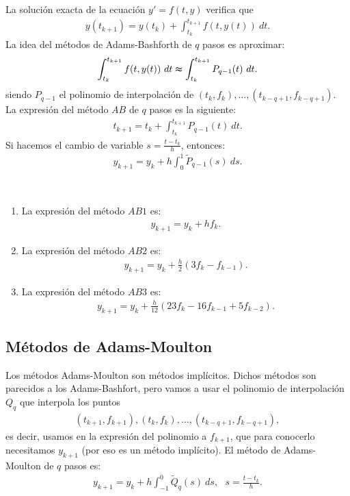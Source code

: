 \noindent La solución exacta de la ecuación $y' = f(t,y)$ verifica que 
\begin{align*}
    y(t_{k+1}) = y(t_k) + \int_{t_k}^{t_{k+1}} f(t,y(t)) \ dt.
\end{align*}
La idea del métodos de Adams-Bashforth de $q$ pasos es aproximar:
\begin{align*}
    \int_{t_k}^{t_{k+1}} f(t,y(t)) \ dt \thickapprox \int_{t_k}^{t_{k+1}} P_{q-1}(t) \ dt.
\end{align*}
siendo $P_{q-1}$ el polinomio de interpolación de $(t_k,f_k),\ldots,(t_{k-q+1},f_{k-q+1})$.
\\
\newline
La expresión del método $AB$ de $q$ pasos es la siguiente:
\begin{align*}
    t_{k+1} = t_k + \int_{t_k}^{t_{k+1}} P_{q-1}(t) \ dt.
\end{align*}
Si hacemos el cambio de variable $s = \frac{t - t_k}{h}$, entonces:
\begin{align*}
\boxed{
    y_{k+1} = y_k + h \int_{0}^{1} \widetilde{P}_{q-1}(s) \ ds.
}
\end{align*}

\begin{ejemplo} \
\begin{enumerate} 
    \item La expresión del método $AB1$ es:
    \begin{align*}
        y_{k+1} = y_k + hf_k.
    \end{align*}
    \item La expresión del método $AB2$ es:
    \begin{align*}
        y_{k+1} = y_k + \frac{h}{2}(3f_k - f_{k-1}).
    \end{align*}
    \item La expresión del método $AB3$ es:
    \begin{align*}
        y_{k+1} = y_k + \frac{h}{12}(23f_k - 16f_{k-1} +5f_{k-2}).
    \end{align*}
\end{enumerate}
\end{ejemplo}

\subsection{Métodos de Adams-Moulton}

\noindent Los métodos Adams-Moulton son métodos implícitos. Dichos métodos son parecidos a los Adams-Bashfort, pero vamos a usar el polinomio de interpolación $Q_q$ que interpola los puntos 
\begin{align*}
    (t_{k+1},f_{k+1}),(t_k,f_k),\ldots,(t_{k-q+1},f_{k-q+1}),
\end{align*}
es decir, usamos en la expresión del polinomio a $f_{k+1}$, que para conocerlo necesitamos $y_{k+1}$ (por eso es un método implícito). El método de Adams-Moulton de $q$ pasos es:
\begin{align*}
\boxed{
    y_{k+1} = y_k + h\int_{-1}^{0} \widetilde{Q}_q (s) \ ds, \ \ \ s = \frac{t - t_k}{h}.
}
\end{align*}

